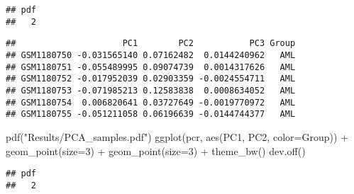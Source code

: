 \documentclass[
]{article}
\newenvironment{Shaded}{\begin{snugshade}}{\end{snugshade}}
\newcommand{\AttributeTok}[1]{\textcolor[rgb]{0.77,0.63,0.00}{#1}}
\newcommand{\DecValTok}[1]{\textcolor[rgb]{0.00,0.00,0.81}{#1}}
\newcommand{\FunctionTok}[1]{\textcolor[rgb]{0.00,0.00,0.00}{#1}}
\newcommand{\NormalTok}[1]{#1}
\newcommand{\OtherTok}[1]{\textcolor[rgb]{0.56,0.35,0.01}{#1}}
\newcommand{\SpecialCharTok}[1]{\textcolor[rgb]{0.00,0.00,0.00}{#1}}
\newcommand{\StringTok}[1]{\textcolor[rgb]{0.31,0.60,0.02}{#1}}
\begin{document}
\begin{verbatim}
## pdf 
##   2
\end{verbatim}

\begin{Shaded}
\end{Shaded}

\begin{verbatim}
##                     PC1        PC2           PC3 Group
## GSM1180750 -0.031565140 0.07162482  0.0144240962   AML
## GSM1180751 -0.055489995 0.09074739  0.0014317626   AML
## GSM1180752 -0.017952039 0.02903359 -0.0024554711   AML
## GSM1180753 -0.071985213 0.12583838  0.0008634052   AML
## GSM1180754  0.006820641 0.03727649 -0.0019770972   AML
## GSM1180755 -0.051211058 0.06196639 -0.0144744377   AML
\end{verbatim}

\begin{Shaded}
\begin{Highlighting}[]
\FunctionTok{pdf}\NormalTok{(}\StringTok{"Results/PCA\_samples.pdf"}\NormalTok{)}
\FunctionTok{ggplot}\NormalTok{(pcr, }\FunctionTok{aes}\NormalTok{(PC1, PC2, }\AttributeTok{color=}\NormalTok{Group)) }\SpecialCharTok{+} \FunctionTok{geom\_point}\NormalTok{(}\AttributeTok{size=}\DecValTok{3}\NormalTok{) }\SpecialCharTok{+} \FunctionTok{geom\_point}\NormalTok{(}\AttributeTok{size=}\DecValTok{3}\NormalTok{) }\SpecialCharTok{+} \FunctionTok{theme\_bw}\NormalTok{()}
\FunctionTok{dev.off}\NormalTok{()}
\end{Highlighting}
\end{Shaded}

\begin{verbatim}
## pdf 
##   2
\end{verbatim}
\end{document}

